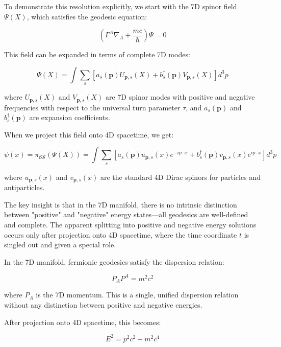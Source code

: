 \documentclass{article}
\begin{document}
To demonstrate this resolution explicitly, we start with the 7D spinor field $\Psi(X)$, which satisfies the geodesic equation:

\begin{equation}
\left(\Gamma^A \nabla_A + \frac{mc}{\hbar}\right) \Psi = 0
\end{equation}

This field can be expanded in terms of complete 7D modes:

\begin{equation}
\Psi(X) = \int \sum_s \left[ a_s(\mathbf{p}) U_{\mathbf{p},s}(X) + b_s^\dagger(\mathbf{p}) V_{\mathbf{p},s}(X) \right] d^3p
\end{equation}

where $U_{\mathbf{p},s}(X)$ and $V_{\mathbf{p},s}(X)$ are 7D spinor modes with positive and negative frequencies with respect to the universal turn parameter $\tau$, and $a_s(\mathbf{p})$ and $b_s^\dagger(\mathbf{p})$ are expansion coefficients.

When we project this field onto 4D spacetime, we get:

\begin{equation}
\psi(x) = \pi_{\mathcal{OS}}(\Psi(X)) = \int \sum_s \left[ a_s(\mathbf{p}) u_{\mathbf{p},s}(x) e^{-ip \cdot x} + b_s^\dagger(\mathbf{p}) v_{\mathbf{p},s}(x) e^{ip \cdot x} \right] d^3p
\end{equation}

where $u_{\mathbf{p},s}(x)$ and $v_{\mathbf{p},s}(x)$ are the standard 4D Dirac spinors for particles and antiparticles.

The key insight is that in the 7D manifold, there is no intrinsic distinction between "positive" and "negative" energy states—all geodesics are well-defined and complete. The apparent splitting into positive and negative energy solutions occurs only after projection onto 4D spacetime, where the time coordinate $t$ is singled out and given a special role.

In the 7D manifold, fermionic geodesics satisfy the dispersion relation:

\begin{equation}
P_A P^A = m^2c^2
\end{equation}

where $P_A$ is the 7D momentum. This is a single, unified dispersion relation without any distinction between positive and negative energies.

After projection onto 4D spacetime, this becomes:

\begin{equation}
E^2 = p^2c^2 + m^2c^4
\end{equation}
\end{document}
